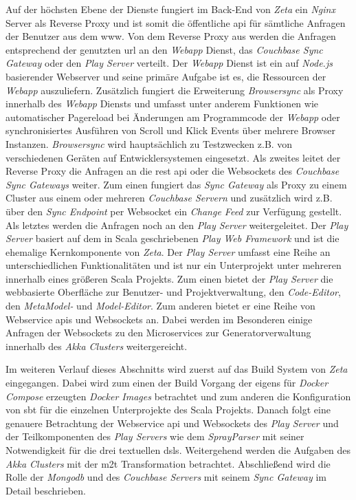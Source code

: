 Auf der höchsten Ebene der Dienste fungiert im Back-End von \textit{Zeta} ein \textit{Nginx} Server als Reverse Proxy und ist somit die öffentliche \ac{api} für sämtliche Anfragen der Benutzer aus dem \ac{www}. Von dem Reverse Proxy aus werden die Anfragen entsprechend der genutzten \ac{url} an den \textit{Webapp} Dienst, das \textit{Couchbase Sync Gateway} oder den \textit{Play Server} verteilt. Der \textit{Webapp} Dienst ist ein auf \textit{Node.js} basierender Webserver und seine primäre Aufgabe ist es, die Ressourcen der \textit{Webapp} auszuliefern. Zusätzlich fungiert die Erweiterung \textit{Browsersync} als Proxy innerhalb des \textit{Webapp} Diensts und umfasst unter anderem Funktionen wie automatischer Pagereload bei Änderungen am Programmcode der \textit{Webapp} oder synchronisiertes Ausführen von Scroll und Klick Events über mehrere Browser Instanzen. \textit{Browsersync} wird hauptsächlich zu Testzwecken z.B. von verschiedenen Geräten auf Entwicklersystemen eingesetzt. Als zweites leitet der Reverse Proxy die Anfragen an die \ac{rest} \ac{api} oder die Websockets des \textit{Couchbase Sync Gateways} weiter. Zum einen fungiert das \textit{Sync Gateway} als Proxy zu einem Cluster aus einem oder mehreren \textit{Couchbase Servern} und zusätzlich wird z.B. über den \textit{Sync Endpoint} per Websocket ein \textit{Change Feed} zur Verfügung gestellt. Als letztes werden die Anfragen noch an den \textit{Play Server} weitergeleitet. Der \textit{Play Server} basiert auf dem in Scala geschriebenen \textit{Play Web Framework} und ist die ehemalige Kernkomponente von \textit{Zeta}. Der \textit{Play Server} umfasst eine Reihe an unterschiedlichen Funktionalitäten und ist nur ein Unterprojekt unter mehreren innerhalb eines größeren Scala Projekts. Zum einen bietet der \textit{Play Server} die webbasierte Oberfläche zur Benutzer- und Projektverwaltung, den \textit{Code-Editor}, den \textit{MetaModel-} und \textit{Model-Editor}. Zum anderen bietet er eine Reihe von Webservice \acp{api} und Websockets an. Dabei werden im Besonderen einige Anfragen der Websockets zu den Microservices zur Generatorverwaltung innerhalb des \textit{Akka Clusters} weitergereicht.

Im weiteren Verlauf dieses Abschnitts wird zuerst auf das Build System von \textit{Zeta} eingegangen. Dabei wird zum einen der Build Vorgang der eigens für \textit{Docker Compose} erzeugten \textit{Docker Images} betrachtet und zum anderen die Konfiguration von \ac{sbt} für die einzelnen Unterprojekte des Scala Projekts. Danach folgt eine genauere Betrachtung der Webservice \ac{api} und Websockets des \textit{Play Server} und der Teilkomponenten des \textit{Play Servers} wie dem \textit{SprayParser} mit seiner Notwendigkeit für die drei textuellen \acp{dsl}. Weitergehend werden die Aufgaben des \textit{Akka Clusters} mit der \ac{m2t} Transformation betrachtet. Abschließend wird die Rolle der \textit{Mongodb} und des \textit{Couchbase Servers} mit seinem \textit{Sync Gateway} im Detail beschrieben.

